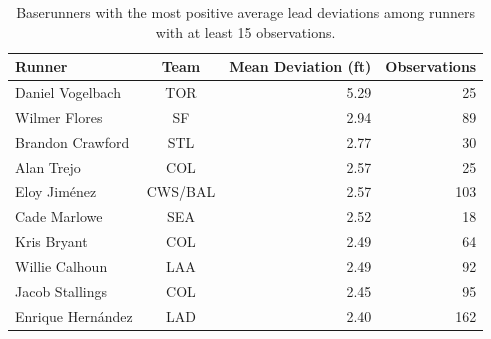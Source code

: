 \begin{table}[!htbp]
\centering
\small
\caption{Baserunners with the most positive average lead deviations among runners with at least 15 observations.}
\label{tab:runners_aggressive}

\begin{tabular}{lcrr}
\toprule
Runner & Team & Mean Deviation (ft) & Observations\\
\midrule
Daniel Vogelbach & TOR & 5.29 & 25\\
Wilmer Flores & SF & 2.94 & 89\\
Brandon Crawford & STL & 2.77 & 30\\
Alan Trejo & COL & 2.57 & 25\\
Eloy Jiménez & CWS/BAL & 2.57 & 103\\
Cade Marlowe & SEA & 2.52 & 18\\
Kris Bryant & COL & 2.49 & 64\\
Willie Calhoun & LAA & 2.49 & 92\\
Jacob Stallings & COL & 2.45 & 95\\
Enrique Hernández & LAD & 2.40 & 162\\
\bottomrule
\end{tabular}
\end{table}
